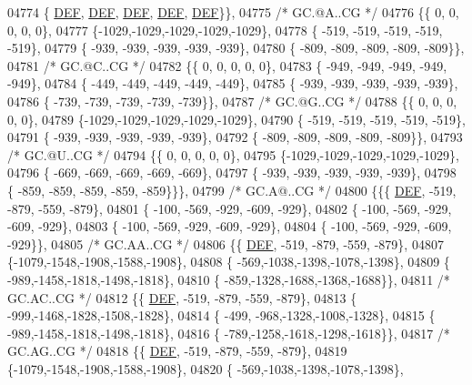 \begin{DoxyCode}
04774 \{  \mbox{\hyperlink{1_88_84__epars_8h_a397419fc12b37ed479c8abb9d444d843}{DEF}},  \mbox{\hyperlink{1_88_84__epars_8h_a397419fc12b37ed479c8abb9d444d843}{DEF}},  \mbox{\hyperlink{1_88_84__epars_8h_a397419fc12b37ed479c8abb9d444d843}{DEF}},  \mbox{\hyperlink{1_88_84__epars_8h_a397419fc12b37ed479c8abb9d444d843}{DEF}},  \mbox{\hyperlink{1_88_84__epars_8h_a397419fc12b37ed479c8abb9d444d843}{DEF}}\}\},
04775 \textcolor{comment}{/* GC.@A..CG */}
04776 \{\{    0,    0,    0,    0,    0\},
04777 \{-1029,-1029,-1029,-1029,-1029\},
04778 \{ -519, -519, -519, -519, -519\},
04779 \{ -939, -939, -939, -939, -939\},
04780 \{ -809, -809, -809, -809, -809\}\},
04781 \textcolor{comment}{/* GC.@C..CG */}
04782 \{\{    0,    0,    0,    0,    0\},
04783 \{ -949, -949, -949, -949, -949\},
04784 \{ -449, -449, -449, -449, -449\},
04785 \{ -939, -939, -939, -939, -939\},
04786 \{ -739, -739, -739, -739, -739\}\},
04787 \textcolor{comment}{/* GC.@G..CG */}
04788 \{\{    0,    0,    0,    0,    0\},
04789 \{-1029,-1029,-1029,-1029,-1029\},
04790 \{ -519, -519, -519, -519, -519\},
04791 \{ -939, -939, -939, -939, -939\},
04792 \{ -809, -809, -809, -809, -809\}\},
04793 \textcolor{comment}{/* GC.@U..CG */}
04794 \{\{    0,    0,    0,    0,    0\},
04795 \{-1029,-1029,-1029,-1029,-1029\},
04796 \{ -669, -669, -669, -669, -669\},
04797 \{ -939, -939, -939, -939, -939\},
04798 \{ -859, -859, -859, -859, -859\}\}\},
04799 \textcolor{comment}{/* GC.A@..CG */}
04800 \{\{\{  \mbox{\hyperlink{1_88_84__epars_8h_a397419fc12b37ed479c8abb9d444d843}{DEF}}, -519, -879, -559, -879\},
04801 \{ -100, -569, -929, -609, -929\},
04802 \{ -100, -569, -929, -609, -929\},
04803 \{ -100, -569, -929, -609, -929\},
04804 \{ -100, -569, -929, -609, -929\}\},
04805 \textcolor{comment}{/* GC.AA..CG */}
04806 \{\{  \mbox{\hyperlink{1_88_84__epars_8h_a397419fc12b37ed479c8abb9d444d843}{DEF}}, -519, -879, -559, -879\},
04807 \{-1079,-1548,-1908,-1588,-1908\},
04808 \{ -569,-1038,-1398,-1078,-1398\},
04809 \{ -989,-1458,-1818,-1498,-1818\},
04810 \{ -859,-1328,-1688,-1368,-1688\}\},
04811 \textcolor{comment}{/* GC.AC..CG */}
04812 \{\{  \mbox{\hyperlink{1_88_84__epars_8h_a397419fc12b37ed479c8abb9d444d843}{DEF}}, -519, -879, -559, -879\},
04813 \{ -999,-1468,-1828,-1508,-1828\},
04814 \{ -499, -968,-1328,-1008,-1328\},
04815 \{ -989,-1458,-1818,-1498,-1818\},
04816 \{ -789,-1258,-1618,-1298,-1618\}\},
04817 \textcolor{comment}{/* GC.AG..CG */}
04818 \{\{  \mbox{\hyperlink{1_88_84__epars_8h_a397419fc12b37ed479c8abb9d444d843}{DEF}}, -519, -879, -559, -879\},
04819 \{-1079,-1548,-1908,-1588,-1908\},
04820 \{ -569,-1038,-1398,-1078,-1398\},

\end{DoxyCode}

